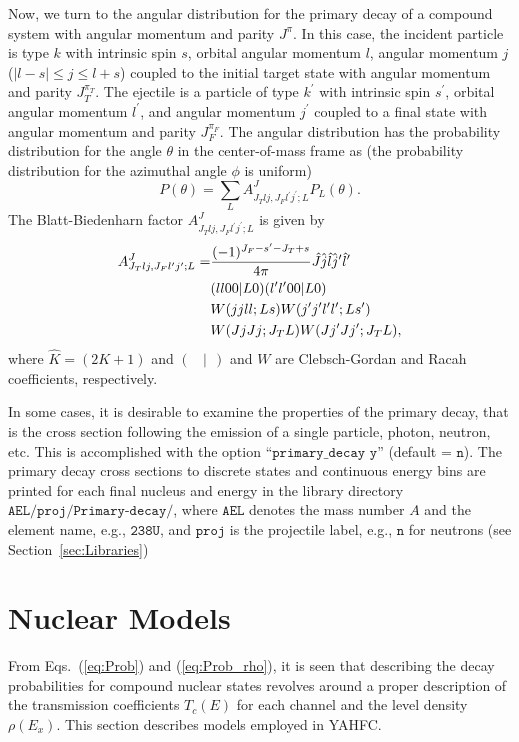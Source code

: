 \documentclass[
10pt,
showpacs,preprintnumbers,footinbib,
amsfonts,amsmath,amssymb,
aps,
prc,twocolumn,groupedaddress,superscriptaddress,
showkeys,
nofootinbib
]{revtex4-1}
\begin{document}
Now, we turn to the angular distribution for the primary decay of a compound system with angular momentum and parity $J^\pi$. In this case, the incident particle is type  $k$ with intrinsic spin $s$, orbital angular momentum $l$, angular momentum $j$ ($|l-s| \le j \le l+s$) coupled to the initial target state with angular momentum and parity $J_T^{\pi_T}$. The ejectile is a particle of type $k^\prime$ with intrinsic spin $s^\prime$, orbital angular momentum $l^\prime$, and angular momentum $j^\prime$ coupled to a final state with angular momentum and parity $J_F^{\pi_F}$. The angular distribution has the probability distribution for the angle $\theta$ in the center-of-mass frame as (the probability distribution for the azimuthal angle $\phi$ is uniform)
\begin{equation}
P(\theta) = \sum_L A^J_{J_Tlj,J_Fl^\prime j^\prime ;L} P_L(\theta).
\end{equation}
The Blatt-Biedenharn factor $A^J_{J_Tlj,J_Fl^\prime j^\prime ;L}$ is given by
\begin{align}
A^J_{J_Tlj,J_Fl^\prime j^\prime ;L} = & \frac{(-1)^{J_F-s^\prime-J_T+s}}{4\pi} \hat J \hat j \hat l \hat j^\prime \hat l^\prime \notag\\
 & (ll00|L0)(l^\prime l^\prime 00|L0)\notag\\
 & W(jjll;Ls)W(j^\prime j^\prime l^\prime l^\prime; L s^\prime) \notag \\
 & W(JjJj;J_TL) W(Jj^\prime Jj^\prime ;J_TL),
 \label{eq:Pri-Ang}
\end{align}
where $\hat K = (2K+1)$ and $(~~~~|~~)$ and $W$ are Clebsch-Gordan and Racah coefficients, respectively.

In some cases, it is desirable to examine the properties of the primary decay, that is the cross section following the emission of a single particle, photon, neutron, etc. This is accomplished with the option ``${\texttt{primary\_decay y}}$'' (default = ${\texttt{n}}$). The primary decay cross sections to discrete states and continuous energy bins are printed for each final nucleus and energy in the library directory ${\texttt{AEL/proj/Primary-decay/}}$, where ${\texttt{AEL}}$ denotes the mass number $A$ and the element name, e.g., ${\texttt{238U}}$, and ${\texttt{proj}}$ is the projectile label, e.g., ${\texttt{n}}$ for neutrons (see Section~\ref{sec:Libraries})

\section{Nuclear Models}
From Eqs.~(\ref{eq:Prob}) and (\ref{eq:Prob_rho}), it is seen that describing the decay probabilities for compound nuclear states revolves around a proper description of the transmission coefficients $T_c(E)$ for each channel and the level density $\rho(E_x)$. This section describes models employed in YAHFC.
\end{document}
